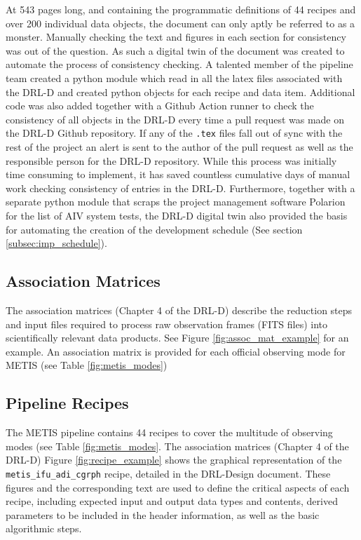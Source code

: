 \documentclass[a4paper]{spie}  %
\begin{document}
At 543 pages long, and containing the programmatic definitions of 44 recipes and over 200 individual data objects, the document can only aptly be referred to as a monster.
Manually checking the text and figures in each section for consistency was out of the question.
As such a digital twin of the document was created to automate the process of consistency checking.
A talented member of the pipeline team created a python module which read in all the latex files associated with the DRL-D and created python objects for each recipe and data item. 
Additional code was also added together with a Github Action runner to check the consistency of all objects in the DRL-D every time a pull request was made on the DRL-D Github repository.
If any of the \verb+.tex+ files fall out of sync with the rest of the project an alert is sent to the author of the pull request as well as the responsible person for the DRL-D repository.
While this process was initially time consuming to implement, it has saved countless cumulative days of manual work checking consistency of entries in the DRL-D.
Furthermore, together with a separate python module that scraps the project management software Polarion for the list of AIV system tests, the DRL-D digital twin also provided the basis for automating the creation of the development schedule (See section \ref{subsec:imp_schedule}). 

\subsection{Association Matrices}

The association matrices (Chapter 4 of the DRL-D) describe the reduction steps and input files required to process raw observation frames (FITS files) into scientifically relevant data products. 
See Figure \ref{fig:assoc_mat_example} for an example. 
An association matrix is provided for each official observing mode for METIS (see Table \ref{fig:metis_modes})

\subsection{Pipeline Recipes}

The METIS pipeline contains 44 recipes to cover the multitude of observing modes (see Table \ref{fig:metis_modes}. 
The association matrices (Chapter 4 of the DRL-D)
Figure \ref{fig:recipe_example} shows the graphical representation of the \verb|metis_ifu_adi_cgrph| recipe, detailed in the DRL-Design document\cite{DRLD}. 
These figures and the corresponding text are used to define the critical aspects of each recipe, including expected input and output data types and contents, derived parameters to be included in the header information, as well as the basic algorithmic steps.
\end{document}
